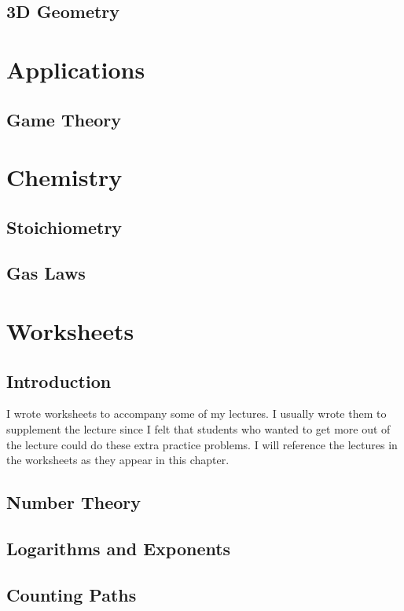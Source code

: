 \documentclass{book}
\begin{document}
\section{3D Geometry}


\chapter{Applications}
\section{Game Theory}


\chapter{Chemistry}
\section{Stoichiometry}

\newpage
\section{Gas Laws}


\chapter{Worksheets}
\section*{Introduction}
I wrote worksheets to accompany some of my lectures. I usually wrote them to supplement the lecture since I felt that students who wanted to get more out of the lecture could do these extra practice problems. I will reference the lectures in the worksheets as they appear in this chapter.

\section{Number Theory}

\newpage

\section{Logarithms and Exponents}

\newpage

\section{Counting Paths}

\newpage
\end{document}
